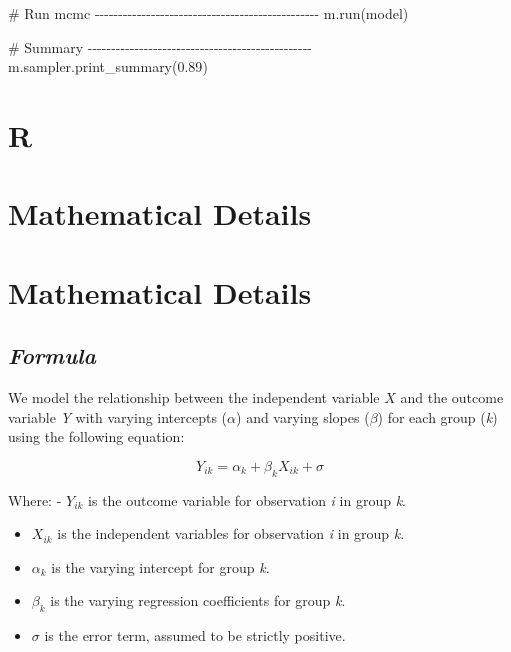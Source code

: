 \documentclass[
  letterpaper,
  DIV=11,
  numbers=noendperiod]{scrreprt}
\newenvironment{Shaded}{\begin{snugshade}}{\end{snugshade}}
\newcommand{\CommentTok}[1]{\textcolor[rgb]{0.37,0.37,0.37}{#1}}
\newcommand{\FloatTok}[1]{\textcolor[rgb]{0.68,0.00,0.00}{#1}}
\newcommand{\NormalTok}[1]{\textcolor[rgb]{0.00,0.23,0.31}{#1}}
\begin{document}
\begin{Shaded}
\begin{Highlighting}[]
\CommentTok{\# Run mcmc {-}{-}{-}{-}{-}{-}{-}{-}{-}{-}{-}{-}{-}{-}{-}{-}{-}{-}{-}{-}{-}{-}{-}{-}{-}{-}{-}{-}{-}{-}{-}{-}{-}{-}{-}{-}{-}{-}{-}{-}{-}{-}{-}{-}{-}{-}{-}{-}}
\NormalTok{m.run(model) }

\CommentTok{\# Summary {-}{-}{-}{-}{-}{-}{-}{-}{-}{-}{-}{-}{-}{-}{-}{-}{-}{-}{-}{-}{-}{-}{-}{-}{-}{-}{-}{-}{-}{-}{-}{-}{-}{-}{-}{-}{-}{-}{-}{-}{-}{-}{-}{-}{-}{-}{-}{-}}
\NormalTok{m.sampler.print\_summary(}\FloatTok{0.89}\NormalTok{)}
\end{Highlighting}
\end{Shaded}

\section{R}

\begin{Shaded}
\begin{Highlighting}[]

\end{Highlighting}
\end{Shaded}

\section{Mathematical Details}\label{mathematical-details-12}

\section{Mathematical Details}\label{mathematical-details-13}

\subsection{\texorpdfstring{\emph{Formula}}{Formula}}\label{formula-5}

We model the relationship between the independent variable \(X\) and the
outcome variable \emph{Y} with varying intercepts (\(\alpha\)) and
varying slopes (\(\beta\)) for each group (\emph{k}) using the following
equation:

\[
Y_{ik} = \alpha_k + \beta_k X_{ik} + \sigma
\]

Where: - \(Y_{ik}\) is the outcome variable for observation \emph{i} in
group \emph{k}.

\begin{itemize}
\item
  \(X_{ik}\) is the independent variables for observation \emph{i} in
  group \emph{k}.
\item
  \(\alpha_k\) is the varying intercept for group \emph{k}.
\item
  \(\beta_k\) is the varying regression coefficients for group \emph{k}.
\item
  \(\sigma\) is the error term, assumed to be strictly positive.
\end{itemize}
\end{document}
